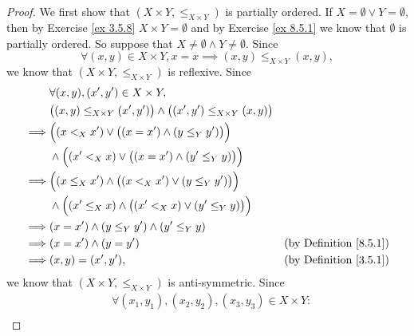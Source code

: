 \begin{proof}
    We first show that \((X \times Y, \leq_{X \times Y})\) is partially ordered.
    If \(X = \emptyset \lor Y = \emptyset\), then by Exercise \ref{ex 3.5.8} \(X \times Y = \emptyset\) and by Exercise \ref{ex 8.5.1} we know that \(\emptyset\) is partially ordered.
    So suppose that \(X \neq \emptyset \land Y \neq \emptyset\).
    Since
    \[
        \forall (x, y) \in X \times Y, x = x \implies (x, y) \leq_{X \times Y} (x, y),
    \]
    we know that \((X \times Y, \leq_{X \times Y})\) is reflexive.
    Since
    \begin{align*}
                 & \forall (x, y), (x', y') \in X \times Y,                                                                                           \\
                 & \big((x, y) \leq_{X \times Y} (x', y')\big) \land \big((x', y') \leq_{X \times Y} (x, y)\big)                                      \\
        \implies & \Big((x <_X x') \lor \big((x = x') \land (y \leq_Y y')\big)\Big)                                                                   \\
                 & \land \Big((x' <_X x) \lor \big((x = x') \land (y' \leq_Y y)\big)\Big)                                                             \\
        \implies & \Big((x \leq_X x') \land \big((x <_X x') \lor (y \leq_Y y')\big)\Big)                                                              \\
                 & \land \Big((x' \leq_X x) \land \big((x' <_X x) \lor (y' \leq_Y y)\big)\Big)                                                        \\
        \implies & (x = x') \land (y \leq_Y y') \land (y' \leq_Y y)                                                                                   \\
        \implies & (x = x') \land (y = y')                                                                       & \text{(by Definition \ref{8.5.1})} \\
        \implies & (x, y) = (x', y'),                                                                            & \text{(by Definition \ref{3.5.1})}
    \end{align*}
    we know that \((X \times Y, \leq_{X \times Y})\) is anti-symmetric.
    Since
    \begin{align*}
                 & \forall (x_1, y_1), (x_2, y_2), (x_3, y_3) \in X \times Y :                                                                                    \\

\end{align*}
\end{proof}
